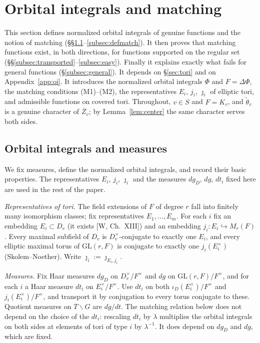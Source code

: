 \documentclass[12pt]{article}
\newcommand{\ov}[1]{\overline{#1}}
\newcommand{\GL}{\mathrm{GL}}
\newcommand{\Zb}{\ov{Z}}
\newcommand{\iD}{\iota_D}
\newcommand{\jj}{\jmath}
\theoremstyle{plain}
\theoremstyle{definition}
\begin{document}
\section{Orbital integrals and matching}\label{sec:matching}
This section defines normalized orbital integrals of genuine functions and the notion of matching (\S\S\ref{subsec:oi}--\ref{subsec:defmatch}). It then proves that matching functions exist, in both directions, for functions supported on the regular set (\S\S\ref{subsec:transported}--\ref{subsec:easy}). Finally it explains exactly what fails for general functions (\S\ref{subsec:general}). It depends on \S\ref{sec:tori} and on Appendix~\ref{app:oi}. It introduces the normalized orbital integrals $\Phi$ and $F=\Delta\Phi$, the matching conditions (M1)--(M2), the representatives $E_i$, $j_i$, $\jj_i$ of elliptic tori, and admissible functions on covered tori. Throughout, $v\in S$ and $F=K_v$, and $\tilde\theta_v$ is a genuine character of $\Zb_v$; by Lemma~\ref{lem:center} the same character serves both sides.

\subsection{Orbital integrals and measures}\label{subsec:oi}
We fix measures, define the normalized orbital integrals, and record their basic properties. The representatives $E_i$, $j_i$, $\jj_i$ and the measures $dg_D$, $dg$, $dt_i$ fixed here are used in the rest of the paper.

\emph{Representatives of tori.} The field extensions of $F$ of degree $r$ fall into finitely many isomorphism classes; fix representatives $E_1,\dots,E_m$. For each $i$ fix an embedding $E_i\subset D_v$ (it exists [W, Ch.~XIII]) and an embedding $j_i:E_i\hookrightarrow M_r(F)$. Every maximal subfield of $D_v$ is $D_v^\times$-conjugate to exactly one $E_i$, and every elliptic maximal torus of $\GL(r,F)$ is conjugate to exactly one $j_i(E_i^\times)$ (Skolem--Noether). Write $\jj_i:=\jj_{E_i,j_i}$.

\emph{Measures.} Fix Haar measures $dg_D$ on $D_v^\times/F^\times$ and $dg$ on $\GL(r,F)/F^\times$, and for each $i$ a Haar measure $dt_i$ on $E_i^\times/F^\times$. Use $dt_i$ on both $\iD(E_i^\times)/F^\times$ and $j_i(E_i^\times)/F^\times$, and transport it by conjugation to every torus conjugate to these. Quotient measures on $T\backslash G$ are $dg/dt$. The matching relation below does not depend on the choice of the $dt_i$: rescaling $dt_i$ by $\lambda$ multiplies the orbital integrals on both sides at elements of tori of type $i$ by $\lambda^{-1}$. It does depend on $dg_D$ and $dg$, which are fixed.
\end{document}
